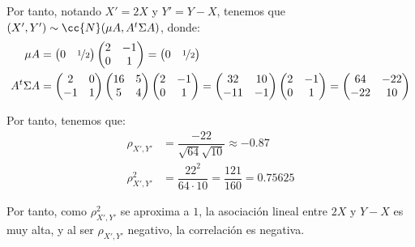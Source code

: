 \documentclass[12pt]{article}
\begin{document}
\begin{ejercicio}[1 puntos]
\begin{enumerate}
            Por tanto, notando $X'=2X$ y $Y'=Y-X$, tenemos que $(X',Y')\sim \cc{N}(\mu A,A^t\Sigma A)$, donde:
            \begin{align*}
                \mu A &= \begin{pmatrix}
                    0 & \nicefrac{1}{2}
                \end{pmatrix}\begin{pmatrix}
                    2 & -1 \\ 0 & 1
                \end{pmatrix} = \begin{pmatrix}
                    0 & \nicefrac{1}{2}
                \end{pmatrix}
                \\
                A^t\Sigma A &= \begin{pmatrix}
                    2 & 0 \\ -1 & 1
                \end{pmatrix}\begin{pmatrix}
                    16 & 5 \\ 5 & 4
                \end{pmatrix}\begin{pmatrix}
                    2 & -1 \\ 0 & 1
                \end{pmatrix} = \begin{pmatrix}
                    32 & 10 \\ -11 & -1
                \end{pmatrix}
                \begin{pmatrix}
                    2 & -1 \\ 0 & 1
                \end{pmatrix}
                = \begin{pmatrix}
                    64 & -22 \\ -22 & 10
                \end{pmatrix}
            \end{align*}

            Por tanto, tenemos que:
            \begin{align*}
                \rho_{X',Y'} &= \dfrac{-22}{\sqrt{64}\sqrt{10}} \approx -0.87\\
                \rho_{X',Y'}^2 &= \dfrac{22^2}{64\cdot 10} = \dfrac{121}{160} = 0.75625
            \end{align*}

            Por tanto, como $\rho_{X',Y'}^2$ se aproxima a $1$, la asociación lineal entre $2X$ y $Y-X$ es muy alta, y al ser $\rho_{X',Y'}$ negativo, la correlación es negativa.
        \end{enumerate}
    \end{ejercicio}
\end{document}
